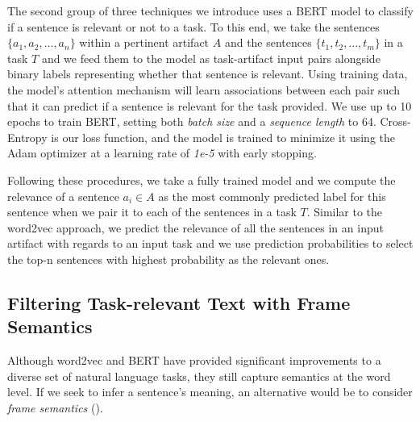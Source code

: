 The second group of three techniques we introduce uses a BERT model to classify if a sentence is relevant or not to a task.
To this end, we take the sentences $\{a_1, a_2, \dots, a_n\}$ within a pertinent artifact $A$ and the sentences $\{t_1, t_2, \dots, t_m\}$ in a task $T$ and we feed them to the model as task-artifact input pairs 
alongside binary labels representing whether that sentence is relevant. 
Using training data, the model's attention mechanism will learn associations between each pair such that it can predict if a sentence is relevant for the task provided. We use up to 10 epochs to train BERT, setting both \textit{batch size} and a \textit{sequence length} to 64. Cross-Entropy is our loss function, and the model is trained to minimize it using the Adam optimizer at a learning rate of \textit{1e-5} with early stopping. 




Following these procedures, we take a fully trained model and we compute the relevance of a sentence $a_i \in A$ as the most commonly predicted label for this sentence when we pair it to each of the sentences in a task $T$.
Similar to the word2vec approach, we predict the relevance of all the sentences in an input artifact with regards to an input task and we use prediction probabilities to select 
the top-n sentences with highest probability as the relevant ones.









\subsection{Filtering Task-relevant Text with Frame Semantics}
\label{cp5:approach-filters}




Although word2vec and BERT have provided significant improvements to a diverse set of natural language tasks, 
they still capture semantics at the word level. 
If we seek to infer a sentence's meaning, an alternative would be to consider  \textit{frame semantics} ().


